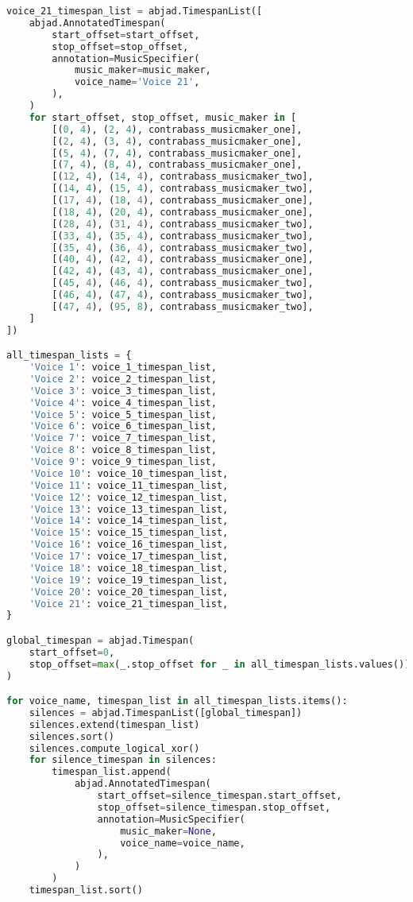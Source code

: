 \begin{lstlisting}[language=Python, caption=Invocation Source Code]
voice_21_timespan_list = abjad.TimespanList([
    abjad.AnnotatedTimespan(
        start_offset=start_offset,
        stop_offset=stop_offset,
        annotation=MusicSpecifier(
            music_maker=music_maker,
            voice_name='Voice 21',
        ),
    )
    for start_offset, stop_offset, music_maker in [
        [(0, 4), (2, 4), contrabass_musicmaker_one],
        [(2, 4), (3, 4), contrabass_musicmaker_one],
        [(5, 4), (7, 4), contrabass_musicmaker_one],
        [(7, 4), (8, 4), contrabass_musicmaker_one],
        [(12, 4), (14, 4), contrabass_musicmaker_two],
        [(14, 4), (15, 4), contrabass_musicmaker_two],
        [(17, 4), (18, 4), contrabass_musicmaker_one],
        [(18, 4), (20, 4), contrabass_musicmaker_one],
        [(28, 4), (31, 4), contrabass_musicmaker_two],
        [(33, 4), (35, 4), contrabass_musicmaker_two],
        [(35, 4), (36, 4), contrabass_musicmaker_two],
        [(40, 4), (42, 4), contrabass_musicmaker_one],
        [(42, 4), (43, 4), contrabass_musicmaker_one],
        [(45, 4), (46, 4), contrabass_musicmaker_two],
        [(46, 4), (47, 4), contrabass_musicmaker_two],
        [(47, 4), (95, 8), contrabass_musicmaker_two],
    ]
])

all_timespan_lists = {
    'Voice 1': voice_1_timespan_list,
    'Voice 2': voice_2_timespan_list,
    'Voice 3': voice_3_timespan_list,
    'Voice 4': voice_4_timespan_list,
    'Voice 5': voice_5_timespan_list,
    'Voice 6': voice_6_timespan_list,
    'Voice 7': voice_7_timespan_list,
    'Voice 8': voice_8_timespan_list,
    'Voice 9': voice_9_timespan_list,
    'Voice 10': voice_10_timespan_list,
    'Voice 11': voice_11_timespan_list,
    'Voice 12': voice_12_timespan_list,
    'Voice 13': voice_13_timespan_list,
    'Voice 14': voice_14_timespan_list,
    'Voice 15': voice_15_timespan_list,
    'Voice 16': voice_16_timespan_list,
    'Voice 17': voice_17_timespan_list,
    'Voice 18': voice_18_timespan_list,
    'Voice 19': voice_19_timespan_list,
    'Voice 20': voice_20_timespan_list,
    'Voice 21': voice_21_timespan_list,
}

global_timespan = abjad.Timespan(
    start_offset=0,
    stop_offset=max(_.stop_offset for _ in all_timespan_lists.values())
)

for voice_name, timespan_list in all_timespan_lists.items():
    silences = abjad.TimespanList([global_timespan])
    silences.extend(timespan_list)
    silences.sort()
    silences.compute_logical_xor()
    for silence_timespan in silences:
        timespan_list.append(
            abjad.AnnotatedTimespan(
                start_offset=silence_timespan.start_offset,
                stop_offset=silence_timespan.stop_offset,
                annotation=MusicSpecifier(
                    music_maker=None,
                    voice_name=voice_name,
                ),
            )
        )
    timespan_list.sort()


\end{lstlisting}
